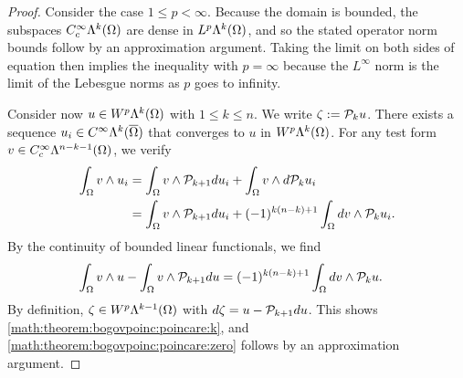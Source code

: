 \documentclass[10pt,a4paper]{article}
\newcommand{\todo}[1]{{\colorbox{yellow}{#1}}}
\newcommand{\mwl}[1]{{\color{red}#1}}
\begin{document}

\begin{proof}
    Consider the case $1 \leq p < \infty$.
    Because the domain is bounded, 
    the subspaces $C^{\infty}_{c}\Lambda^{k}(\Omega)$ are dense in $L^{p}\Lambda^{k}(\Omega)$,
    and so the stated operator norm bounds follow by an approximation argument. 
    Taking the limit on both sides of equation then implies the inequality with $p = \infty$
    because the $L^{\infty}$ norm is the limit of the Lebesgue norms as $p$ goes to infinity. 
    
    
    Consider now $u \in W^{p}\Lambda^{k}(\Omega)$ with $1 \leq k \leq n$. 
    We write $\zeta := {\mathcal P}_{k  } u$. 
    There exists a sequence $u_{i} \in C^{\infty}\Lambda^{k}(\overline\Omega)$ that converges to $u$ in $W^{p}\Lambda^{k}(\Omega)$. 
    For any test form $v \in C^{\infty}_{c}\Lambda^{n-k-1}(\Omega)$, we verify 
    \begin{align*}
        \int_{\Omega} v \wedge u_{i} 
        &=
        \int_{\Omega} v \wedge {\mathcal P}_{k+1} d u_{i}
        +
        \int_{\Omega} v \wedge d {\mathcal P}_{k  } u_{i}
        \\&=
        \int_{\Omega} v \wedge {\mathcal P}_{k+1} d u_{i}
        +
        (-1)^{k(n-k)+1}
        \int_{\Omega} d v \wedge {\mathcal P}_{k  } u_{i}
        .
    \end{align*}
    By the continuity of bounded linear functionals, we find 
    \begin{align*}
        \int_{\Omega} v \wedge u 
        -
        \int_{\Omega} v \wedge {\mathcal P}_{k+1} d u 
        &=
        (-1)^{k(n-k)+1}
        \int_{\Omega} d v \wedge {\mathcal P}_{k  } u 
        .
    \end{align*}
    By definition, $\zeta \in W^{p}\Lambda^{k-1}(\Omega)$ with $d \zeta = u - {\mathcal P}_{k+1} d u$.
    This shows \eqref{math:theorem:bogovpoinc:poincare:k}, and \eqref{math:theorem:bogovpoinc:poincare:zero} follows by an approximation argument.
    
    
    

\end{proof}
\end{document}
